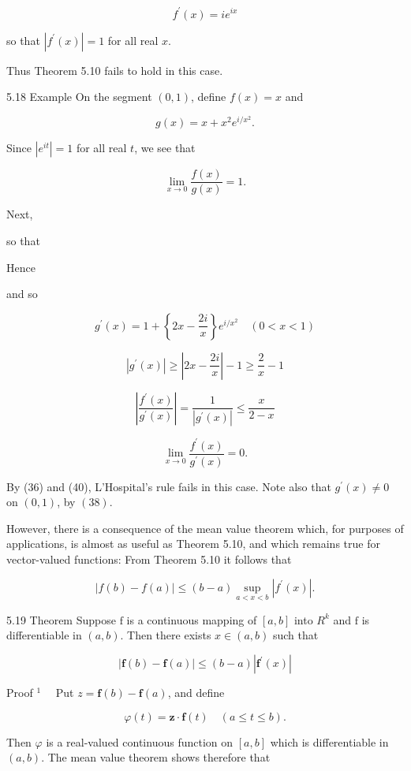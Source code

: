 \documentclass[10pt]{article}
\begin{document}
$$
f^{\prime}(x)=i e^{i x}
$$

so that $\left|f^{\prime}(x)\right|=1$ for all real $x$.

Thus Theorem 5.10 fails to hold in this case.

5.18 Example On the segment $(0,1)$, define $f(x)=x$ and

$$
g(x)=x+x^{2} e^{i / x^{2}} .
$$

Since $\left|e^{i t}\right|=1$ for all real $t$, we see that

$$
\lim _{x \rightarrow 0} \frac{f(x)}{g(x)}=1 .
$$

Next,

so that

Hence

and so

$$
g^{\prime}(x)=1+\left\{2 x-\frac{2 i}{x}\right\} e^{i / x^{2}} \quad(0<x<1)
$$

$$
\left|g^{\prime}(x)\right| \geq\left|2 x-\frac{2 i}{x}\right|-1 \geq \frac{2}{x}-1
$$

$$
\left|\frac{f^{\prime}(x)}{g^{\prime}(x)}\right|=\frac{1}{\left|g^{\prime}(x)\right|} \leq \frac{x}{2-x}
$$

$$
\lim _{x \rightarrow 0} \frac{f^{\prime}(x)}{g^{\prime}(x)}=0 .
$$

By (36) and (40), L'Hospital's rule fails in this case. Note also that $g^{\prime}(x) \neq 0$ on $(0,1)$, by $(38)$.

However, there is a consequence of the mean value theorem which, for purposes of applications, is almost as useful as Theorem 5.10, and which remains true for vector-valued functions: From Theorem 5.10 it follows that

$$
|f(b)-f(a)| \leq(b-a) \sup _{a<x<b}\left|f^{\prime}(x)\right| .
$$

5.19 Theorem Suppose $\mathrm{f}$ is a continuous mapping of $[a, b]$ into $R^{k}$ and $\mathrm{f}$ is differentiable in $(a, b)$. Then there exists $x \in(a, b)$ such that

$$
|\mathbf{f}(b)-\mathbf{f}(a)| \leq(b-a)\left|\mathbf{f}^{\prime}(x)\right|
$$

Proof $^{1} \quad$ Put $z=\mathbf{f}(b)-\mathbf{f}(a)$, and define

$$
\varphi(t)=\mathbf{z} \cdot \mathbf{f}(t) \quad(a \leq t \leq b) .
$$

Then $\varphi$ is a real-valued continuous function on $[a, b]$ which is differentiable in $(a, b)$. The mean value theorem shows therefore that
\end{document}
